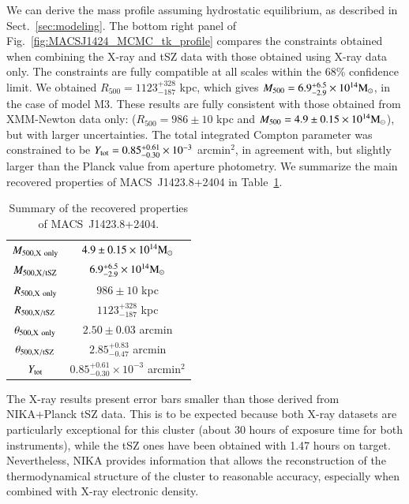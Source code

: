 \documentclass[twocolumn,traditabstract]{aa}
\begin{document}
We can derive the mass profile assuming hydrostatic equilibrium, as described in Sect.~\ref{sec:modeling}. The bottom right panel of Fig.~\ref{fig:MACSJ1424_MCMC_tk_profile} compares the constraints obtained when combining the X-ray and tSZ data with those obtained using X-ray data only. The constraints are fully compatible at all scales within the 68\% confidence limit. We obtained $R_{500} = 1123^{+328}_{-187}$ kpc, which gives $M_{500} = 6.9^{+6.5}_{-2.9}  \times 10^{14} {\rm M}_{\odot}$, in the case of model M3. These results are fully consistent with those obtained from XMM-Newton data only: ($R_{500} = 986 \pm 10$ kpc and $M_{500} = 4.9 \pm 0.15 \times 10^{14} {\rm M}_{\odot}$), but with larger uncertainties. The total integrated Compton parameter was constrained to be $Y_{\rm tot} = 0.85^{+0.61}_{-0.30} \times 10^{-3}$ arcmin$^2$, in agreement with, but slightly larger than the Planck value from aperture photometry. We summarize the main recovered properties of \mbox{MACS~J1423.8+2404} in Table~\ref{tab:summary}.
\begin{table}[h]
\caption{Summary of the recovered properties of \mbox{MACS~J1423.8+2404}.}
\begin{center}
\begin{tabular}{cc}
\hline
\hline
$M_{500, {\rm X \ only}}$ & $4.9 \pm 0.15 \times 10^{14} {\rm M}_{\odot}$ \\
$M_{500, {\rm X/tSZ}}$ & $6.9^{+6.5}_{-2.9}  \times 10^{14} {\rm M}_{\odot}$\\
$R_{500, {\rm X \ only}}$ & $986 \pm 10$ kpc\\
$R_{500, {\rm X/tSZ}}$ & $1123^{+328}_{-187}$ kpc\\
$\theta_{500, {\rm X \ only}}$ & $2.50 \pm 0.03$ arcmin \\
$\theta_{500, {\rm X/tSZ}}$ & $2.85^{+0.83}_{-0.47}$ arcmin\\
$Y_{\rm tot}$ & $0.85^{+0.61}_{-0.30} \times 10^{-3}$ arcmin$^2$ \\
\hline
\end{tabular}
\end{center}
\label{tab:summary}
\end{table}

The X-ray results present error bars smaller than those derived from NIKA+Planck tSZ data. This is to be expected because both X-ray datasets are particularly exceptional for this cluster (about 30 hours of exposure time for both instruments), while the tSZ ones have been obtained with 1.47 hours on target. Nevertheless, NIKA provides information that allows the reconstruction of the thermodynamical structure of the cluster to reasonable accuracy, especially when combined with X-ray electronic density.
\end{document}
